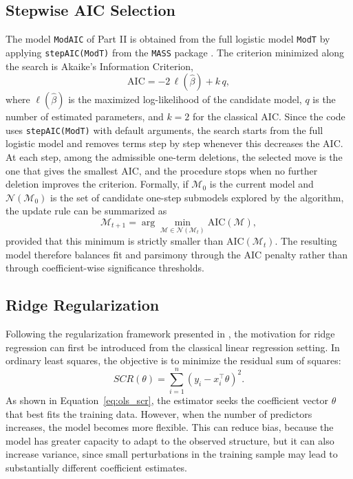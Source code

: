 \subsection{Stepwise AIC Selection}
\label{subsec:step_aic}
The model \texttt{ModAIC} of Part II is obtained from the full logistic model \texttt{ModT} by applying \texttt{stepAIC(ModT)} from the \texttt{MASS} package \cite{stepaicmass,raicdoc}. The criterion minimized along the search is Akaike's Information Criterion,
\begin{equation}
\mathrm{AIC}=-2\,\ell(\widehat{\beta})+k\,q,
\label{eq:aic}
\end{equation}
where \(\ell(\widehat{\beta})\) is the maximized log-likelihood of the candidate model, \(q\) is the number of estimated parameters, and \(k=2\) for the classical AIC. Since the code uses \texttt{stepAIC(ModT)} with default arguments, the search starts from the full logistic model and removes terms step by step whenever this decreases the AIC. At each step, among the admissible one-term deletions, the selected move is the one that gives the smallest AIC, and the procedure stops when no further deletion improves the criterion. Formally, if \(\mathcal{M}_0\) is the current model and \(\mathcal{N}(\mathcal{M}_0)\) is the set of candidate one-step submodels explored by the algorithm, the update rule can be summarized as
\begin{equation}
\mathcal{M}_{t+1}=\arg\min_{\mathcal{M}\in\mathcal{N}(\mathcal{M}_t)} \mathrm{AIC}(\mathcal{M}),
\label{eq:stepaic_update}
\end{equation}
provided that this minimum is strictly smaller than \(\mathrm{AIC}(\mathcal{M}_t)\). The resulting model therefore balances fit and parsimony through the AIC penalty rather than through coefficient-wise significance thresholds.

\subsection{Ridge Regularization}
\label{subsec:ridge_regularization}
Following the regularization framework presented in \cite{keribin2025supervised}, the motivation for ridge regression can first be introduced from the classical linear regression setting. In ordinary least squares, the objective is to minimize the residual sum of squares:
\begin{equation}
SCR(\theta)
=
\sum_{i=1}^{n}
\left(
y_i - x_i^\top \theta
\right)^2 .
\label{eq:ols_scr}
\end{equation}
As shown in Equation~\eqref{eq:ols_scr}, the estimator seeks the coefficient vector \(\theta\) that best fits the training data. However, when the number of predictors increases, the model becomes more flexible. This can reduce bias, because the model has greater capacity to adapt to the observed structure, but it can also increase variance, since small perturbations in the training sample may lead to substantially different coefficient estimates.

